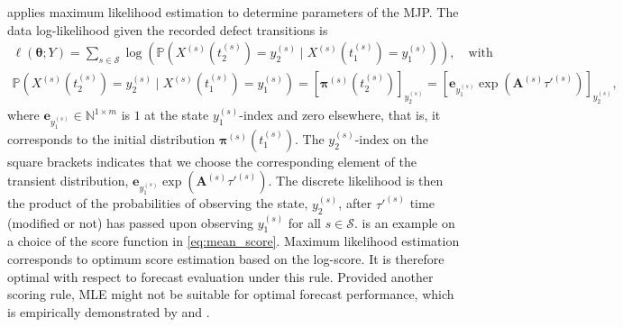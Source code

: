 \citet{bisgaard2024A} applies maximum likelihood estimation to determine parameters of the MJP.
The data log-likelihood given the recorded defect transitions is 
\begin{equation}
\begin{aligned}
                  \ell\left( \bm{\theta}; Y \right) = 
                  \sum_{s \in \mathcal{S}} \log \left( \mathds{P}\left(X^{(s)}(t_2^{(s)}) = y_2^{(s)} \mid X^{(s)}(t_1^{(s)}) = y_1^{(s)} \right) \right), \quad \text{with} \\ 
                 \mathds{P}\left(X^{(s)}(t_2^{(s)}) = y_2^{(s)} \mid X^{(s)}(t_1^{(s)}) = y_1^{(s)} \right) = \left[ \bm{\pi}^{(s)}\left( t_2^{(s)} \right)  \right]_{ y_2^{(s)}} =  \left[ \bm{e}_{y_{1}^{(s)}}  \exp \left( \bm{A}^{(s)} \tau'^{(s)} \right) \right]_{ y_2^{(s)}},
                  \label{eq:likelihood_mjp}
\end{aligned}     
\end{equation}
where $\bm{e}_{y_{1}^{(s)}} \in \mathbb{N}^{1 \times m}$ is $1$ at the state $y_{1}^{(s)}$-index and zero elsewhere, that is, it corresponds to the initial distribution $\bm{\pi}^{(s)}(t_1^{(s)})$. The $y_2^{(s)}$-index on the square brackets indicates that we choose the corresponding element of the transient distribution, $\bm{e}_{y_{1}^{(s)}}  \exp \left( \bm{A}^{(s)} \tau'^{(s)} \right)$. 
The discrete likelihood is then the product of the probabilities of observing the state, $y_2^{(s)}$, after $\tau'^{(s)}$ time (modified or not) has passed upon observing $y_1^{(s)}$ for all $s \in \mathcal{S}$.
 is an example on a choice of the score function in \cref{eq:mean_score}.
Maximum likelihood estimation corresponds to optimum score estimation based on the log-score. It is therefore optimal with respect to forecast evaluation under this rule. Provided another scoring rule, MLE might not be suitable for optimal forecast performance, which is empirically demonstrated by \citet{Gneiting2005} and \citet{gebetsberger2018a}.
